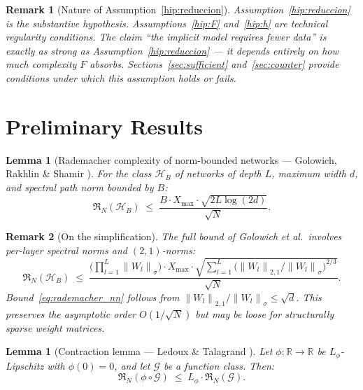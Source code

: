 \documentclass[12pt]{article}
\newtheorem{lemma}[theorem]{Lemma}
\newtheorem{remark}{Remark}
\newcommand{\R}{\mathbb{R}}
\newcommand{\norm}[1]{\left\|#1\right\|}
\newcommand{\Rad}{\mathfrak{R}}
\begin{document}
\begin{remark}[Nature of Assumption~\ref{hip:reduccion}]
\label{rem:nature}
Assumption~\ref{hip:reduccion} is the substantive hypothesis.
Assumptions~\ref{hip:F} and~\ref{hip:h} are technical regularity
conditions.
The claim ``the implicit model requires fewer data'' is exactly as
strong as Assumption~\ref{hip:reduccion} --- it depends entirely on
how much complexity $F$ absorbs.
Sections~\ref{sec:sufficient} and~\ref{sec:counter} provide
conditions under which this assumption holds or fails.
\end{remark}

\section{Preliminary Results}
\label{sec:prelim}

\begin{lemma}[Rademacher complexity of norm-bounded networks ---
Golowich, Rakhlin \& Shamir \cite{Golowich2018}]
\label{lema:rad}
For the class $\mathcal{H}_B$ of networks of depth $L$, maximum
width $d$, and spectral path norm bounded by $B$:
\begin{equation}
  \Rad_N(\mathcal{H}_B) \;\le\;
  \frac{B \cdot X_{\max} \cdot \sqrt{2L\log(2d)}}{\sqrt{N}}.
  \label{eq:rademacher_nn}
\end{equation}
\end{lemma}

\begin{remark}[On the simplification]
\label{rem:simplification}
The full bound of Golowich et al.\ involves per-layer spectral
norms and $(2,1)$-norms:
\begin{equation}
  \Rad_N(\mathcal{H}_B) \;\le\;
  \frac{\bigl(\prod_{l=1}^{L}\norm{W_l}_\sigma\bigr)
    \cdot X_{\max} \cdot \sqrt{\sum_{l=1}^{L}
    \bigl(\norm{W_l}_{2,1}/\norm{W_l}_\sigma\bigr)^{2/3}}}
  {\sqrt{N}}.
\end{equation}
Bound~\eqref{eq:rademacher_nn} follows from
$\norm{W_l}_{2,1}/\norm{W_l}_\sigma \le \sqrt{d}$.
This preserves the asymptotic order $O(1/\sqrt{N})$ but may be loose
for structurally sparse weight matrices.
\end{remark}

\begin{lemma}[Contraction lemma --- Ledoux \& Talagrand
\cite{Ledoux1991}]
\label{lema:contraccion}
Let $\phi: \R \to \R$ be $L_\phi$-Lipschitz with $\phi(0) = 0$,
and let $\mathcal{G}$ be a function class.
Then:
\begin{equation}
  \Rad_N(\phi \circ \mathcal{G})
  \;\le\; L_\phi \cdot \Rad_N(\mathcal{G}).
\end{equation}
\end{lemma}
\end{document}
